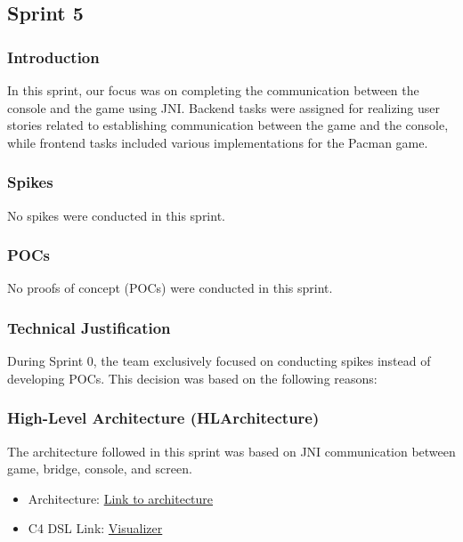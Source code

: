 \subsection{Sprint 5}

\subsubsection{Introduction}
In this sprint, our focus was on completing the communication between the console and the game using JNI. Backend tasks were assigned for realizing user stories related to establishing communication between the game and the console, while frontend tasks included various implementations for the Pacman game.

\subsubsection{Spikes}

No spikes were conducted in this sprint.

\subsubsection{POCs}

No proofs of concept (POCs) were conducted in this sprint.

\subsubsection{Technical Justification}

During Sprint 0, the team exclusively focused on conducting spikes instead of developing POCs. This decision was based on the following reasons:

\subsubsection{High-Level Architecture (HLArchitecture)}

The architecture followed in this sprint was based on JNI communication between game, bridge, console, and screen.

\begin{itemize}
    \item Architecture: \href{https://github.com/Pending-Name-21/arquitecture/pull/12}{Link to architecture}
    \item C4 DSL Link: \href{https://structurizr.com/dsl}{Visualizer}
\end{itemize}

